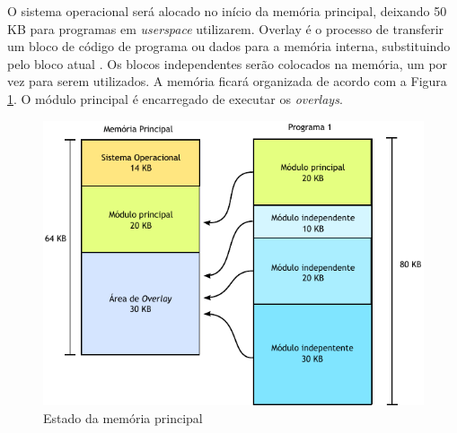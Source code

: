 
O sistema operacional será alocado no início da memória principal, deixando
50 KB para programas em \textsl{userspace} utilizarem.  Overlay é o processo
de transferir um bloco de código de programa ou dados para a memória interna,
substituindo pelo bloco atual \cite{OxfordDictionary}.  Os blocos independentes
serão colocados na memória, um por vez para serem utilizados.  A memória
ficará organizada de acordo com a Figura \ref{OverlayPDF}.  O módulo principal
é encarregado de executar os \textsl{overlays}.

\begin{figure}[!ht]
  \centering
	\includegraphics[scale=1]{img/overlay.pdf}
  \caption{Estado da memória principal \label{OverlayPDF}}
\end{figure}

